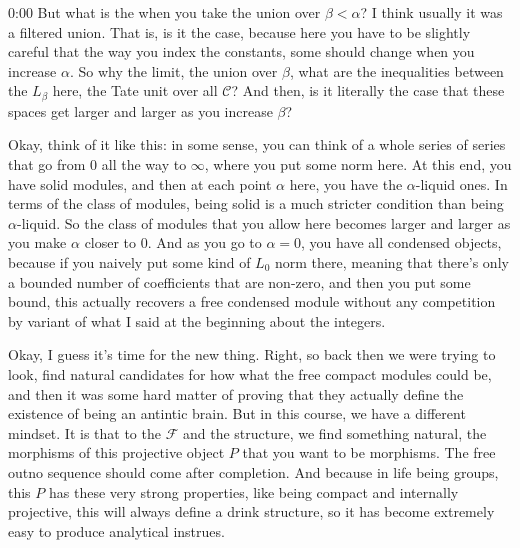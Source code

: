 \begin{unfinished}{0:00}
But what is the when you take the union over $\beta < \alpha$? I think usually it was a filtered union. That is, is it the case, because here you have to be slightly careful that the way you index the constants, some should change when you increase $\alpha$. So why the limit, the union over $\beta$, what are the inequalities between the $L_\beta$ here, the Tate unit over all $\mathcal{C}$? And then, is it literally the case that these spaces get larger and larger as you increase $\beta$?

Okay, think of it like this: in some sense, you can think of a whole series of series that go from 0 all the way to $\infty$, where you put some norm here. At this end, you have solid modules, and then at each point $\alpha$ here, you have the $\alpha$-liquid ones. In terms of the class of modules, being solid is a much stricter condition than being $\alpha$-liquid. So the class of modules that you allow here becomes larger and larger as you make $\alpha$ closer to 0. And as you go to $\alpha = 0$, you have all condensed objects, because if you naively put some kind of $L_0$ norm there, meaning that there's only a bounded number of coefficients that are non-zero, and then you put some bound, this actually recovers a free condensed module without any competition by variant of what I said at the beginning about the integers.

Okay, I guess it's time for the new thing. Right, so back then we were trying to look, find natural candidates for how what the free compact modules could be, and then it was some hard matter of proving that they actually define the existence of being an antintic brain. But in this course, we have a different mindset. It is that to the $\mathcal{F}$ and the structure, we find something natural, the morphisms of this projective object $P$ that you want to be morphisms. The free outno sequence should come after completion. And because in life being groups, this $P$ has these very strong properties, like being compact and internally projective, this will always define a drink structure, so it has become extremely easy to produce analytical instrues.


\end{unfinished}
